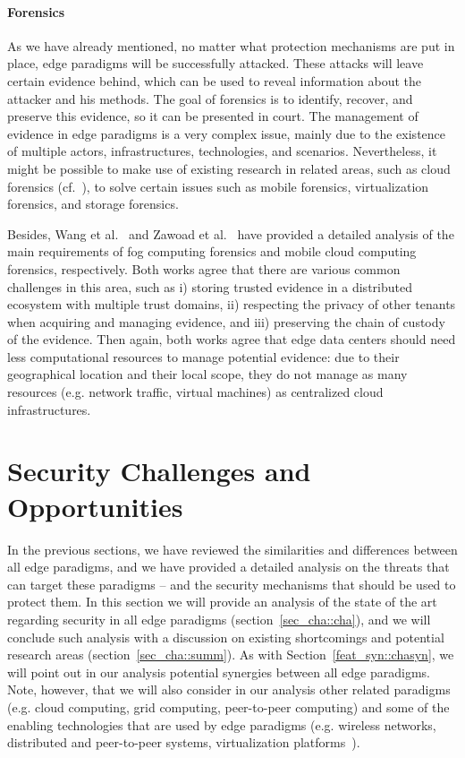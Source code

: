 \documentclass[twocolumn,preprint,3p]{elsarticle}
\begin{document}
\paragraph{Forensics} As we have already mentioned, no matter what protection mechanisms are put in place, edge paradigms will be successfully attacked. These attacks will leave certain evidence behind, which can be used to reveal information about the attacker and his methods. The goal of forensics is to identify, recover, and preserve this evidence, so it can be presented in court. The management of evidence in edge paradigms is a very complex issue, mainly due to the existence of multiple actors, infrastructures, technologies, and scenarios. Nevertheless, it might be possible to make use of existing research in related areas, such as cloud forensics (cf.~\cite{Quang15,VirtForensics10,Rahman16}), to solve certain issues such as mobile forensics, virtualization forensics, and storage forensics.

Besides, Wang et al.~\cite{WangF15} and Zawoad et al.~\cite{ZawoadF15} have provided a detailed analysis of the main requirements of fog computing forensics and mobile cloud computing forensics, respectively. Both works agree that there are various common challenges in this area, such as i) storing trusted evidence in a distributed ecosystem with multiple trust domains, ii) respecting the privacy of other tenants when acquiring and managing evidence, and iii) preserving the chain of custody of the evidence. Then again, both works agree that edge data centers should need less computational resources to manage potential evidence: due to their geographical location and their local scope, they do not manage as many resources (e.g. network traffic, virtual machines) as centralized cloud infrastructures.



\section{Security Challenges and Opportunities}
\label{sec_cha}

In the previous sections, we have reviewed the similarities and differences between all edge paradigms, and we have provided a detailed analysis on the threats that can target these paradigms -- and the security mechanisms that should be used to protect them. In this section we will provide an analysis of the state of the art regarding security in all edge paradigms (section~\ref{sec_cha::cha}), and we will conclude such analysis with a discussion on existing shortcomings and potential research areas (section~\ref{sec_cha::summ}). As with Section~\ref{feat_syn::chasyn}, we will point out in our analysis potential synergies between all edge paradigms. Note, however, that we will also consider in our analysis other related paradigms (e.g. cloud computing, grid computing, peer-to-peer computing) and some of the enabling technologies that are used by edge paradigms (e.g. wireless networks, distributed and peer-to-peer systems, virtualization platforms~\cite{Vaquero14}).
\end{document}

